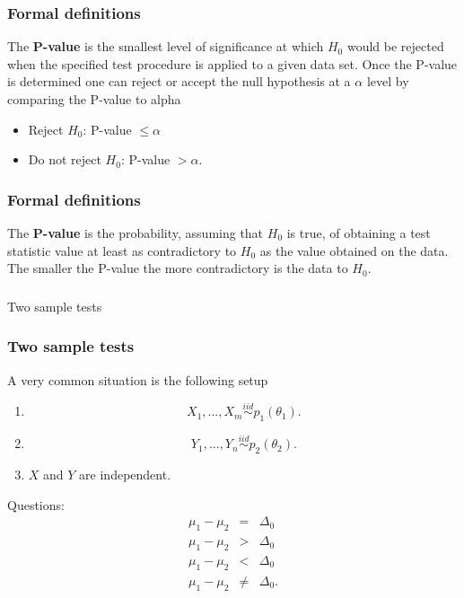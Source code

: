 \begin{frame}[fragile]\frametitle{Formal definitions}

{\tiny

\begin{defn}
The {\bf P-value} is the smallest level of significance at which
$H_0$ would be rejected when the specified test procedure is applied
to a given data set. Once the P-value is determined one can
reject or accept the null hypothesis at a $\alpha$ level by
comparing the P-value to alpha
\begin{itemize}
\item Reject $H_0$:  P-value $\leq \alpha$ 
\item Do not reject $H_0$:  P-value $> \alpha$.
\end{itemize} 

\end{defn}

}
\end{frame}


\begin{frame}[fragile]\frametitle{Formal definitions}

{\tiny

\begin{defn}
The {\bf P-value} is the probability, assuming that $H_0$ is true, of
obtaining a test statistic value at least as contradictory to
$H_0$ as the value obtained on the data. The smaller the P-value
the more contradictory is the data to $H_0$.
\end{defn}

}
\end{frame}


\begin{frame}[fragile]\frametitle{}
\begin{center}
{\Large Two sample tests}

\end{center}
\end{frame}




\begin{frame}[fragile]\frametitle{Two sample tests}

{\tiny
A very common situation is the following setup
\begin{enumerate}
\item $$X_1,...,X_m \stackrel{iid}{\sim} p_1(\theta_1).$$
\item $$Y_1,...,Y_n \stackrel{iid}{\sim} p_2(\theta_2).$$
\item $X$ and $Y$ are independent.
\end{enumerate}

Questions:
\begin{eqnarray*}
\mu_1 - \mu_2 &=& \Delta_0 \\
\mu_1 - \mu_2 & > & \Delta_0 \\
\mu_1 - \mu_2 & < & \Delta_0 \\
\mu_1 - \mu_2 & \neq & \Delta_0.
\end{eqnarray*}
}

\end{frame}

